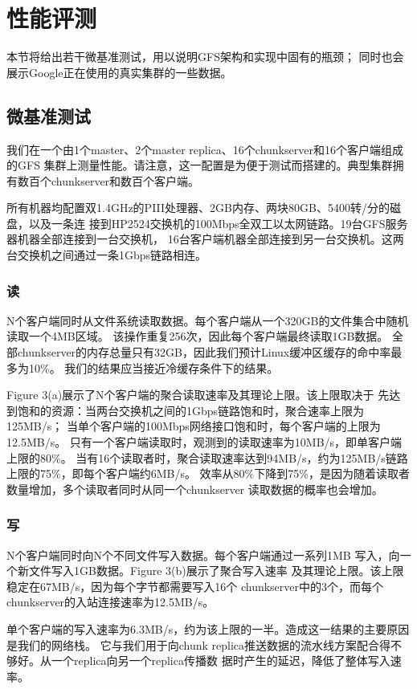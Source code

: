 \section{性能评测}
本节将给出若干微基准测试，用以说明GFS架构和实现中固有的瓶颈；
同时也会展示Google正在使用的真实集群的一些数据。

\subsection{微基准测试}
我们在一个由1个master、2个master replica、16个chunkserver和16个客户端组成的GFS
集群上测量性能。请注意，这一配置是为便于测试而搭建的。典型集群拥有数百个chunkserver和数百个客户端。

所有机器均配置双1.4GHz的PIII处理器、2GB内存、两块80GB、5400转/分的磁盘，以及一条连
接到HP2524交换机的100Mbps全双工以太网链路。19台GFS服务器机器全部连接到一台交换机，
16台客户端机器全部连接到另一台交换机。这两台交换机之间通过一条1Gbps链路相连。

\subsubsection{读}
N个客户端同时从文件系统读取数据。每个客户端从一个320GB的文件集合中随机读取一个4MB区域。
该操作重复256次，因此每个客户端最终读取1GB数据。
全部chunkserver的内存总量只有32GB，因此我们预计Linux缓冲区缓存的命中率最多为10\%。
我们的结果应当接近冷缓存条件下的结果。

Figure 3(a)展示了N个客户端的聚合读取速率及其理论上限。该上限取决于
先达到饱和的资源：当两台交换机之间的1Gbps链路饱和时，聚合速率上限为125MB/s；
当单个客户端的100Mbps网络接口饱和时，每个客户端的上限为12.5MB/s。
只有一个客户端读取时，观测到的读取速率为10MB/s，即单客户端上限的80\%。
当有16个读取者时，聚合读取速率达到94MB/s，约为125MB/s链路上限的75\%，即每个客户端约6MB/s。
效率从80\%下降到75\%，是因为随着读取者数量增加，多个读取者同时从同一个chunkserver
读取数据的概率也会增加。

\subsubsection{写}
N个客户端同时向N个不同文件写入数据。每个客户端通过一系列1MB
写入，向一个新文件写入1GB数据。Figure 3(b)展示了聚合写入速率
及其理论上限。该上限稳定在67MB/s，因为每个字节都需要写入16个
chunkserver中的3个，而每个chunkserver的入站连接速率为12.5MB/s。

单个客户端的写入速率为6.3MB/s，约为该上限的一半。造成这一结果的主要原因是我们的网络栈。
它与我们用于向chunk replica推送数据的流水线方案配合得不够好。从一个replica向另一个replica传播数
据时产生的延迟，降低了整体写入速率。

